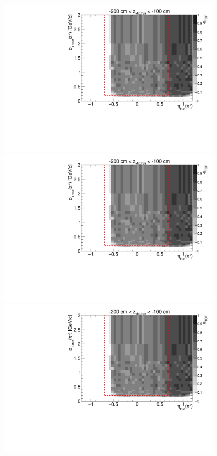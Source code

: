 \begin{figure}[hb]
{  \includegraphics[width=\linewidth,page=6]{graphics/eff/Eff2D_TOF_pion_Plus.pdf}\\
  \includegraphics[width=\linewidth,page=8]{graphics/eff/Eff2D_TOF_pion_Plus.pdf}\\
  \includegraphics[width=\linewidth,page=10]{graphics/eff/Eff2D_TOF_pion_Plus.pdf}
}%
\end{figure}
